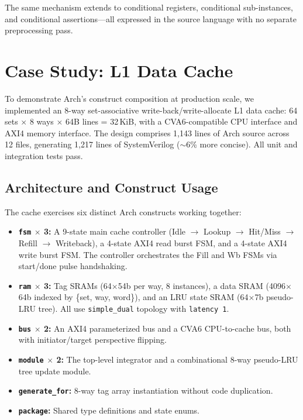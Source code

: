 \documentclass[11pt,twocolumn]{article}
\begin{document}
The same mechanism extends to conditional registers, conditional sub-instances, and conditional assertions---all expressed in the source language with no separate preprocessing pass.

\section{Case Study: L1 Data Cache}\label{sec:example}

To demonstrate Arch's construct composition at production scale, we implemented an 8-way set-associative write-back/write-allocate L1 data cache: 64 sets $\times$ 8 ways $\times$ 64B lines = 32\,KiB, with a CVA6-compatible CPU interface and AXI4 memory interface. The design comprises 1,143 lines of Arch source across 12 files, generating 1,217 lines of SystemVerilog (${\sim}$6\% more concise). All unit and integration tests pass.

\subsection{Architecture and Construct Usage}

The cache exercises six distinct Arch constructs working together:

\begin{itemize}
\item \textbf{\texttt{fsm} $\times$ 3:} A 9-state main cache controller (Idle $\to$ Lookup $\to$ Hit/Miss $\to$ Refill $\to$ Writeback), a 4-state AXI4 read burst FSM, and a 4-state AXI4 write burst FSM. The controller orchestrates the Fill and Wb FSMs via start/done pulse handshaking.
\item \textbf{\texttt{ram} $\times$ 3:} Tag SRAMs (64$\times$54b per way, 8 instances), a data SRAM (4096$\times$64b indexed by \{set, way, word\}), and an LRU state SRAM (64$\times$7b pseudo-LRU tree). All use \texttt{simple\_dual} topology with \texttt{latency 1}.
\item \textbf{\texttt{bus} $\times$ 2:} An AXI4 parameterized bus and a CVA6 CPU-to-cache bus, both with initiator/target perspective flipping.
\item \textbf{\texttt{module} $\times$ 2:} The top-level integrator and a combinational 8-way pseudo-LRU tree update module.
\item \textbf{\texttt{generate\_for}:} 8-way tag array instantiation without code duplication.
\item \textbf{\texttt{package}:} Shared type definitions and state enums.
\end{itemize}
\end{document}
